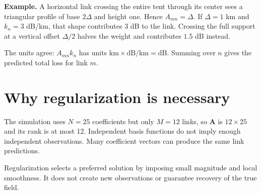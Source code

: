 \documentclass[11pt,a4paper]{article}
\newcommand{\vect}[1]{\mathbf{#1}}
\begin{document}
\textbf{Example.} A horizontal link crossing the entire tent through its center sees a triangular profile of base $2\Delta$ and height one. Hence $A_{mn}=\Delta$. If $\Delta=1$ km and $k_n=3$ dB/km, that shape contributes $3$ dB to the link. Crossing the full support at a vertical offset $\Delta/2$ halves the weight and contributes $1.5$ dB instead.

The units agree: $A_{mn}k_n$ has units $\text{km}\times\text{dB/km}=\text{dB}$. Summing over $n$ gives the predicted total loss for link $m$.
\section{Why regularization is necessary}
The simulation uses $N=25$ coefficients but only $M=12$ links, so $\vect A$ is $12\times25$ and its rank is at most 12. Independent basis functions do not imply enough independent observations. Many coefficient vectors can produce the same link predictions.

Regularization selects a preferred solution by imposing small magnitude and local smoothness. It does not create new observations or guarantee recovery of the true field.
\end{document}
